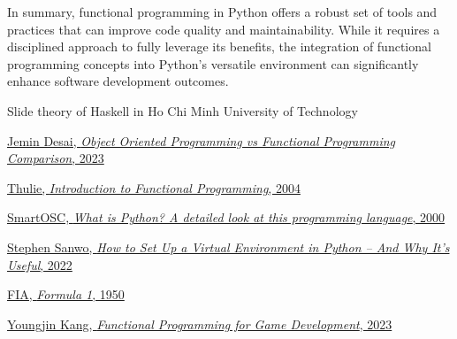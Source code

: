 \documentclass[12pt]{article}
\begin{document}

In summary, functional programming in Python offers a robust set of tools and practices that can improve code quality and maintainability. While it requires a disciplined approach to fully leverage its benefits, the integration of functional programming concepts into Python's versatile environment can significantly enhance software development outcomes.\\


\begin{thebibliography}{80}

Slide theory of Haskell in Ho Chi Minh University of Technology

\href{https://positiwise.com/blog/object-oriented-programming-vs-functional-programming-comparison#:~:text=Object%2Doriented%20programming%20focuses%20on,you%20must%20prefer%20functional%20programming.}{Jemin Desai, \textit{Object Oriented Programming vs Functional Programming Comparison}, 2023}

\href{https://www.turing.com/kb/introduction-to-functional-programming}{Thulie, \textit{Introduction to Functional Programming}, 2004}

\href{https://careers.smartosc.com/en/what-is-python-a-detailed-look-at-this-programming-language/}{SmartOSC, \textit{What is Python? A detailed look at this programming language}, 2000}

\href{https://www.freecodecamp.org/news/how-to-setup-virtual-environments-in-python/}{Stephen Sanwo, \textit{How to Set Up a Virtual Environment in Python – And Why It's Useful}, 2022}

\href{https://www.formula1.com/}{FIA, \textit{Formula 1}, 1950}

\href{https://www.linkedin.com/pulse/functional-programming-game-development-youngjin-kang/}{Youngjin Kang, \textit{Functional Programming for Game Development}, 2023}


\end{thebibliography}
\end{document}
